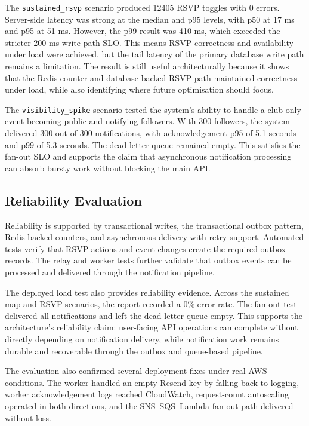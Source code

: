 The \verb|sustained_rsvp| scenario produced 12405 RSVP toggles with 0 errors. Server-side latency was strong at the median and p95 levels, with p50 at 17 ms and p95 at 51 ms. However, the p99 result was 410 ms, which exceeded the stricter 200 ms write-path SLO. This means RSVP correctness and availability under load were achieved, but the tail latency of the primary database write path remains a limitation. The result is still useful architecturally because it shows that the Redis counter and database-backed RSVP path maintained correctness under load, while also identifying where future optimisation should focus.

The \verb|visibility_spike| scenario tested the system's ability to handle a club-only event becoming public and notifying followers. With 300 followers, the system delivered 300 out of 300 notifications, with acknowledgement p95 of 5.1 seconds and p99 of 5.3 seconds. The dead-letter queue remained empty. This satisfies the fan-out SLO and supports the claim that asynchronous notification processing can absorb bursty work without blocking the main API.

\subsection{Reliability Evaluation}

Reliability is supported by transactional writes, the transactional outbox pattern, Redis-backed counters, and asynchronous delivery with retry support. Automated tests verify that RSVP actions and event changes create the required outbox records. The relay and worker tests further validate that outbox events can be processed and delivered through the notification pipeline.

The deployed load test also provides reliability evidence. Across the sustained map and RSVP scenarios, the report recorded a 0\% error rate. The fan-out test delivered all notifications and left the dead-letter queue empty. This supports the architecture's reliability claim: user-facing API operations can complete without directly depending on notification delivery, while notification work remains durable and recoverable through the outbox and queue-based pipeline.

The evaluation also confirmed several deployment fixes under real AWS conditions. The worker handled an empty Resend key by falling back to logging, worker acknowledgement logs reached CloudWatch, request-count autoscaling operated in both directions, and the SNS--SQS--Lambda fan-out path delivered without loss.

